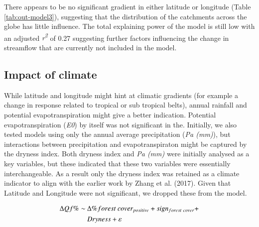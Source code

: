 \documentclass[]{elsarticle} %
\begin{document}
There appears to be no significant gradient in either latitude or longitude (Table \ref{tab:out-model3}), suggesting that the distribution of the catchments across the globe has little influence. The total explaining power of the model is still low with an adjusted \emph{r\textsuperscript{2}} of 0.27 suggesting further factors influencing the change in streamflow that are currently not included in the model.

\hypertarget{impact-of-climate}{%
\subsection{Impact of climate}\label{impact-of-climate}}

While latitude and longitude might hint at climatic gradients (for example a change in response related to tropical or sub tropical belts), annual rainfall and potential evapotranspiration might give a better indication.
Potential evapotranspiration (\emph{E0}) by itself was not significant in the. Initially, we also tested models using only the annual average precipitation (\emph{Pa (mm)}), but interactions between precipitation and evapotranspiraton might be captured by the dryness index. Both dryness index and \emph{Pa (mm)} were initially analysed as a key variables, but these indicated that these two variables were essentially interchangeable. As a result only the dryness index was retained as a climate indicator to align with the earlier work by Zhang et al. (2017). Given that Latitude and Longitude were not significant, we dropped these from the model.

\begin{align}
\Delta Qf \% \sim ~ & \Delta \% forest~cover_{positive} + sign_{forest~cover} + \notag \\ & Dryness  + \varepsilon \label{eq:eq5}
\end{align}
\end{document}

